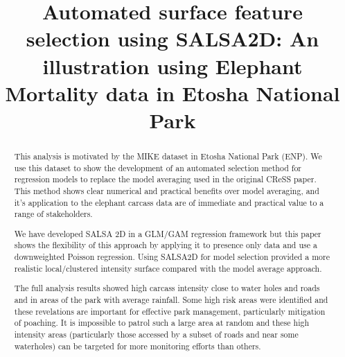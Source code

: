 \documentclass[letterpaper]{interact}
\begin{document}
\title{Automated surface feature selection using SALSA2D: An illustration using Elephant Mortality data in Etosha National Park}


\author{
}

\maketitle %

\begin{abstract}

This analysis is motivated by the MIKE dataset in Etosha National Park (ENP). We use this dataset to show the development of an automated selection method for regression models to replace the model averaging used in the original CReSS paper. This method shows clear numerical and practical benefits over model averaging, and it's application to the elephant carcass data are of immediate and practical value to a range of stakeholders. 

We have developed SALSA 2D in a GLM/GAM regression framework but this paper shows the flexibility of this approach by applying it to presence only data and use a downweighted Poisson regression. Using SALSA2D for model selection provided a more realistic local/clustered intensity surface compared with the model average approach. 

The full analysis results showed high carcass intensity close to water holes and roads and in areas of the park with average rainfall. Some high risk areas were identified and these revelations are important for effective park management, particularly mitigation of poaching. It is impossible to patrol such a large area at random and these high intensity areas (particularly those accessed by a subset of roads and near some waterholes) can be targeted for more monitoring efforts than others.

\end{abstract}
\end{document}
